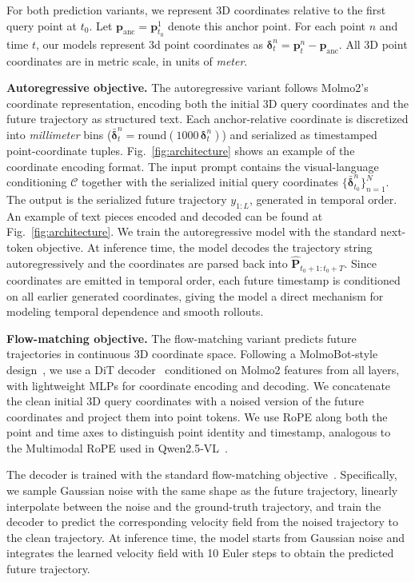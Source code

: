 \documentclass{llmxive}
\begin{document}
For both prediction variants, we represent 3D coordinates relative to the first query point at $t_0$. Let $\mathbf{p}_{\mathrm{anc}}=\mathbf{p}_{t_0}^{1}$ denote this anchor point. For each point $n$ and time $t$, our models represent 3d point coordinates as
$\boldsymbol{\delta}_{t}^{n}
=
\mathbf{p}_{t}^{n}-\mathbf{p}_{\mathrm{anc}}$.
All 3D point coordinates are in metric scale, in units of \textit{meter}.

\noindent\textbf{Autoregressive objective.}
The autoregressive variant follows Molmo2's coordinate representation, encoding both the initial 3D query coordinates and the future trajectory as structured text. Each anchor-relative coordinate is discretized into \textit{millimeter} bins
($\bar{\boldsymbol{\delta}}_{t}^{n}
=
\mathrm{round}\!\left(
1000\,\boldsymbol{\delta}_{t}^{n}
\right)$)
and serialized as timestamped point-coordinate tuples. Fig.~\ref{fig:architecture} shows an example of the coordinate encoding format.
The input prompt contains the visual-language conditioning $\mathcal{C}$ together with the serialized initial query coordinates $\{\bar{\boldsymbol{\delta}}_{t_0}^{n}\}_{n=1}^{N}$. The output is the serialized future trajectory $y_{1:L}$, generated in temporal order. An example of text pieces encoded and decoded can be found at Fig.~\ref{fig:architecture}.
We train the autoregressive model with the standard next-token objective.
At inference time, the model decodes the trajectory string autoregressively and the coordinates are parsed back into $\hat{\mathbf{P}}_{t_0+1:t_0+T}$. Since coordinates are emitted in temporal order, each future timestamp is conditioned on all earlier generated coordinates, giving the model a direct mechanism for modeling temporal dependence and smooth rollouts. 



\noindent\textbf{Flow-matching objective.}
The flow-matching variant predicts future trajectories in continuous 3D coordinate space. Following a MolmoBot-style design~\cite{deshpande2026molmobot}, we use a DiT decoder~\cite{peebles2023dit} conditioned on Molmo2 features from all layers, with lightweight MLPs for coordinate encoding and decoding. We concatenate the clean initial 3D query coordinates with a noised version of the future coordinates and project them into point tokens. We use RoPE along both the point and time axes to distinguish point identity and timestamp, analogous to the Multimodal RoPE used in Qwen2.5-VL~\cite{su2023roformerenhancedtransformerrotary,bai2025qwen25vl}.

The decoder is trained with the standard flow-matching objective~\cite{lipman2023flowmatching}. Specifically, we sample Gaussian noise with the same shape as the future trajectory, linearly interpolate between the noise and the ground-truth trajectory, and train the decoder to predict the corresponding velocity field from the noised trajectory to the clean trajectory. At inference time, the model starts from Gaussian noise and integrates the learned velocity field with 10 Euler steps to obtain the predicted future trajectory.
\end{document}
